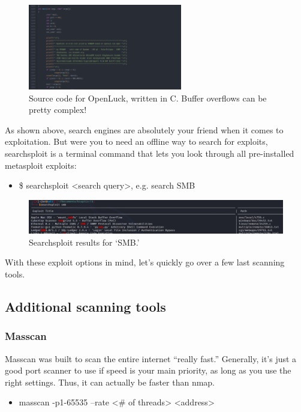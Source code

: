\documentclass[a4paper,11pt]{article}
\renewcommand{\tt}[2][tt]{\textcolor{#1}{\ttfamily #2}}%
\begin{document}
\begin{figure}[h]
    \centering
    \includegraphics[width=0.6\textwidth]{images/OpenLuckgithub.png}
    \caption{Source code for OpenLuck, written in C. Buffer overflows can be pretty complex!}
\end{figure}

As shown above, search engines are absolutely your friend when it comes to exploitation. But were you to need an offline way to search for exploits, \tt{searchsploit} is a terminal command that lets you look through all pre-installed metasploit exploits:
\begin{itemize}
    \item \tt{\$ searchsploit <search query>}, e.g. \tt{search SMB}
\end{itemize}

\begin{figure}[h]
    \centering
    \includegraphics[width=1\textwidth]{images/searchsploit.png}
    \caption{Searchsploit results for `SMB.'}
\end{figure}
With these exploit options in mind, let's quickly go over a few last scanning tools.
\pagebreak

\subsection{Additional scanning tools}

\subsubsection{Masscan}

Masscan was built to scan the entire internet ``really fast.'' Generally, it's just a good port scanner to use if speed is your main priority, as long as you use the right settings. Thus, it can actually be faster than nmap.
\begin{itemize}
    \item \tt{masscan -p1-65535 --rate <\# of threads> <address>}
\end{itemize}
\end{document}
